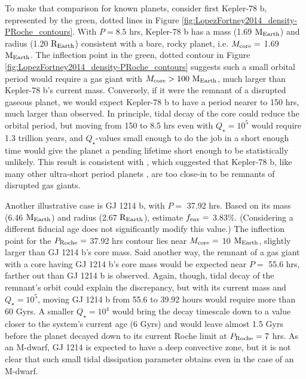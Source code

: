 \documentclass{svjour3}                     %
\begin{document}
To make that comparison for known planets, consider first Kepler-78 b, represented by the green, dotted lines in Figure \ref{fig:LopezFortney2014_density-PRoche_contours}. With $P = 8.5$ hrs, Kepler-78 b has a mass (1.69 ${\rm M_{Earth}}$) and radius (1.20 ${\rm R_{Earth}}$) consistent with a bare, rocky planet, i.e. $M_{\rm core} =$ 1.69 ${\rm M_{Earth}}$. The inflection point in the green, dotted contour in Figure \ref{fig:LopezFortney2014_density-PRoche_contours} suggests such a small orbital period would require a gas giant with $M_{\rm core} > 100\ {\rm M_{Earth}}$, much larger than Kepler-78 b's current mass. Conversely, if it were the remnant of a disrupted gaseous planet, we would expect Kepler-78 b to have a period nearer to 150 hrs, much larger than observed. In principle, tidal decay of the core could reduce the orbital period, but moving from 150 to 8.5 hrs even with $Q_\star = 10^5$ would require 1.3 trillion years, and $Q_\star$-values small enough to do the job in a short enough time would give the planet a pending lifetime short enough to be statistically unlikely. This result is consistent with \cite{2015ApJ...813..101V}, which suggested that Kepler-78 b, like many other ultra-short period planets \cite{2014ApJ...787...47S}, are too close-in to be remnants of disrupted gas giants.

Another illustrative case is GJ 1214 b, with $P =$ 37.92 hrs. Based on its mass (6.46 ${\rm M_{Earth}}$) and radius (2.67 ${\rm R_{Earth}}$), \cite{Lopez2014Understanding} estimate $f_{\rm env} =$ 3.83\%. (Considering a different fiducial age does not significantly modify this value.) The inflection point for the $P_{\rm Roche} =$ 37.92 hrs contour lies near $M_{\rm core} =$ 10 ${\rm M_{Earth}}$, slightly larger than GJ 1214 b's core mass. Said another way, the remnant of a gas giant with a core having GJ 1214 b's core mass would be expected near $P =$ 55.6 hrs, farther out than GJ 1214 b is observed. Again, though, tidal decay of the remnant's orbit could explain the discrepancy, but with its current mass and $Q_\star = 10^5$, moving GJ 1214 b from 55.6 to 39.92 hours would require more than 60 Gyrs. A smaller $Q_\star = 10^4$ would bring the decay timescale down to a value closer to the system's current age (6 Gyrs) and would leave almost 1.5 Gyrs before the planet decayed down to its current Roche limit at $P_{\rm Roche} = 7$ hrs. As an M-dwarf, GJ 1214 is expected to have a deep convective zone, but it is not clear that such small tidal dissipation parameter obtains even in the case of an M-dwarf.
\end{document}
